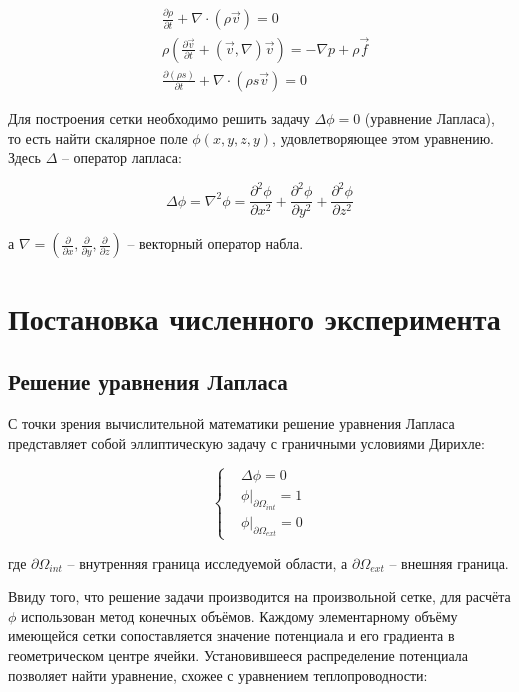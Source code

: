 \documentclass[a4paper,12pt]{article}
\begin{document}
\begin{align}
    & \frac{\partial \rho}{\partial t} + \nabla \cdot \left( \rho \vec v \right) = 0 \\
    & \rho \left( \frac{\partial \vec v}{\partial t} + (\vec v, \nabla) \vec v \right) = - \nabla p + \rho \vec f \\
    & \frac{\partial (\rho s)}{\partial t} + \nabla \cdot (\rho s \vec v) = 0
\end{align}

Для построения сетки необходимо решить задачу $\Delta \phi = 0$ (уравнение Лапласа), то есть найти скалярное поле $\phi(x, y, z, y)$, удовлетворяющее этом уравнению. Здесь $\Delta$ -- оператор лапласа:

\begin{equation}
    \Delta \phi = \nabla^2 \phi = \frac{\partial^2 \phi}{\partial x^2} + \frac{\partial^2 \phi}{\partial y^2} + \frac{\partial^2 \phi}{\partial z^2}
\end{equation}

\noindent
а $\nabla = \left( \frac{\partial}{\partial x}, \frac{\partial}{\partial y}, \frac{\partial}{\partial z} \right)$ -- векторный оператор набла.

\section{Постановка численного эксперимента}

\subsection{Решение уравнения Лапласа}

С точки зрения вычислительной математики решение уравнения Лапласа представляет собой эллиптическую задачу с граничными условиями Дирихле:

\begin{equation}
    \left\{
        \begin{aligned}
            & \Delta \phi = 0 \\
            & \phi|_{\partial \Omega_{int}} = 1 \\
            & \phi|_{\partial \Omega_{ext}} = 0
        \end{aligned}
    \right.
\end{equation}

\noindent
где $\partial \Omega_{int}$ -- внутренняя граница исследуемой области, а $\partial \Omega_{ext}$ -- внешняя граница.

Ввиду того, что решение задачи производится на произвольной сетке, для расчёта $\phi$ использован метод конечных объёмов. Каждому элементарному объёму имеющейся сетки сопоставляется значение потенциала и его градиента в геометрическом центре ячейки. Установившееся распределение потенциала позволяет найти уравнение, схожее с уравнением теплопроводности:
\end{document}
